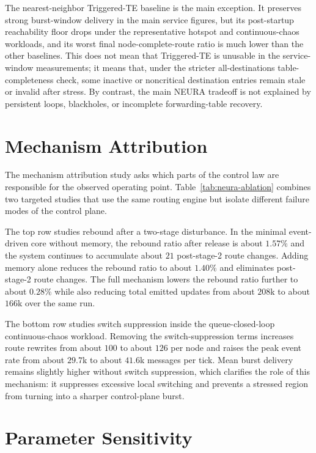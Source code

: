\documentclass[5p,times]{elsarticle}
\begin{document}
The nearest-neighbor Triggered-TE baseline is the main exception. It preserves strong burst-window delivery in the main service figures, but its post-startup reachability floor drops under the representative hotspot and continuous-chaos workloads, and its worst final node-complete-route ratio is much lower than the other baselines. This does not mean that Triggered-TE is unusable in the service-window measurements; it means that, under the stricter all-destinations table-completeness check, some inactive or noncritical destination entries remain stale or invalid after stress. By contrast, the main NEURA tradeoff is not explained by persistent loops, blackholes, or incomplete forwarding-table recovery.

\section{Mechanism Attribution}

The mechanism attribution study asks which parts of the control law are responsible for the observed operating point. Table~\ref{tab:neura-ablation} combines two targeted studies that use the same routing engine but isolate different failure modes of the control plane.

The top row studies rebound after a two-stage disturbance. In the minimal event-driven core without memory, the rebound ratio after release is about $1.57\%$ and the system continues to accumulate about $21$ post-stage-2 route changes. Adding memory alone reduces the rebound ratio to about $1.40\%$ and eliminates post-stage-2 route changes. The full mechanism lowers the rebound ratio further to about $0.28\%$ while also reducing total emitted updates from about $208$k to about $166$k over the same run.

The bottom row studies switch suppression inside the queue-closed-loop continuous-chaos workload. Removing the switch-suppression terms increases route rewrites from about $100$ to about $126$ per node and raises the peak event rate from about $29.7$k to about $41.6$k messages per tick. Mean burst delivery remains slightly higher without switch suppression, which clarifies the role of this mechanism: it suppresses excessive local switching and prevents a stressed region from turning into a sharper control-plane burst.


\section{Parameter Sensitivity}
\end{document}
